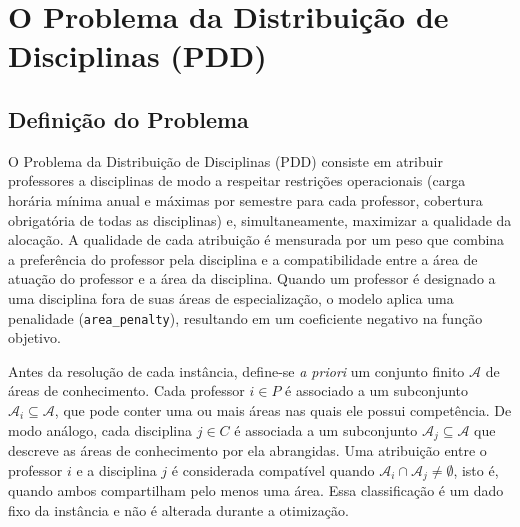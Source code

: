\chapter{O Problema da Distribuição de Disciplinas (PDD)} \label{ch:pdd}

\section{Definição do Problema}

O Problema da Distribuição de Disciplinas (PDD) consiste em atribuir professores a disciplinas de modo a respeitar restrições operacionais (carga horária mínima anual e máximas por semestre para cada professor, cobertura obrigatória de todas as disciplinas) e, simultaneamente, maximizar a qualidade da alocação. A qualidade de cada atribuição é mensurada por um peso que combina a preferência do professor pela disciplina e a compatibilidade entre a área de atuação do professor e a área da disciplina. Quando um professor é designado a uma disciplina fora de suas áreas de especialização, o modelo aplica uma penalidade (\texttt{area\_penalty}), resultando em um coeficiente negativo na função objetivo.

Antes da resolução de cada instância, define-se \textit{a priori} um conjunto finito $\mathcal{A}$ de áreas de conhecimento. Cada professor $i\in P$ é associado a um subconjunto $\mathcal{A}_i \subseteq \mathcal{A}$, que pode conter uma ou mais áreas nas quais ele possui competência. De modo análogo, cada disciplina $j\in C$ é associada a um subconjunto $\mathcal{A}_j \subseteq \mathcal{A}$ que descreve as áreas de conhecimento por ela abrangidas. Uma atribuição entre o professor $i$ e a disciplina $j$ é considerada compatível quando $\mathcal{A}_i \cap \mathcal{A}_j \neq \emptyset$, isto é, quando ambos compartilham pelo menos uma área. Essa classificação é um dado fixo da instância e não é alterada durante a otimização.

